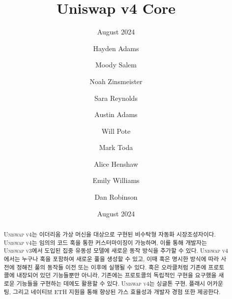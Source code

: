 \documentclass[sigconf,nonacm,prologue,table]{acmart}
\numberwithin{equation}{section}
\theoremstyle{definition}
\theoremstyle{remark}
\begin{document}
\title{Uniswap v4 Core}
\subtitle{August 2024}
\date{August 2024}

\author{Hayden Adams}
\affiliation{
  \institution{}
  \city{}
  \country{} 
}

\author{Moody Salem}
\affiliation{
  \institution{}
  \city{}
  \country{} 
}

\author{Noah Zinsmeister}
\affiliation{
  \institution{}
  \city{}
  \country{} 
}

\author{Sara Reynolds}
\affiliation{
  \institution{}
  \city{}
  \country{} 
}

\author{Austin Adams}
\affiliation{
  \institution{}
  \city{}
  \country{} 
}

\author{Will Pote}
\affiliation{
  \institution{}
  \city{}
  \country{} 
}

\author{Mark Toda}
\affiliation{
  \institution{}
  \city{}
  \country{} 
}

\author{Alice Henshaw}
\affiliation{
  \institution{}
  \city{}
  \country{} 
}

\author{Emily Williams}
\affiliation{
  \institution{}
  \city{}
  \country{} 
}

\author{Dan Robinson}
\affiliation{
  \institution{}
  \city{}
  \country{} 
}

\begin{teaserfigure}
\caption*{
    \hspace{\textwidth}
    }
\end{teaserfigure}

\renewcommand{\shortauthors}{Adams et al.}

\begin{abstract}

\textsc{Uniswap v4}는 이더리움 가상 머신을 대상으로 구현된 비수탁형 자동화 시장조성자이다. \textsc{Uniswap v4}는 임의의 코드 훅을 통한 커스터마이징이 가능하며, 이를 통해 개발자는 \textsc{Uniswap v3}에서 도입된 집중 유동성 모델에 새로운 동작 방식을 추가할 수 있다. \textsc{Uniswap v4}에서는 누구나 훅을 포함하여 새로운 풀을 생성할 수 있고, 이때 훅은 명시한 방식에 따라 사전에 정해진 풀의 동작들 이전 또는 이후에 실행될 수 있다. 훅은 오라클처럼 기존에 프로토콜에 내장되어 있던 기능들뿐만 아니라, 기존에는 프로토콜의 독립적인 구현을 요구했을 새로운 기능들을 구현하는 데에도 활용할 수 있다. \textsc{Uniswap v4}는 싱글톤 구현, 플래시 어카운팅, 그리고 네이티브 ETH 지원을 통해 향상된 가스 효율성과 개발자 경험 또한 제공한다.
\end{abstract}
\end{document}
